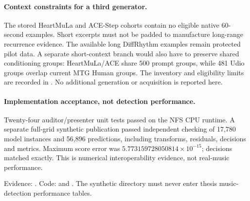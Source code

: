 \documentclass[11pt,a4paper]{article}
\begin{document}
\paragraph{Context constraints for a third generator.}
The stored HeartMuLa and ACE-Step cohorts contain no eligible native 60-second
examples. Short excerpts must not be padded to manufacture long-range
recurrence evidence. The available long DiffRhythm examples remain protected
pilot data. A separate short-context branch would also have to preserve shared
conditioning groups: HeartMuLa/ACE share 500 prompt groups, while 481 Udio
groups overlap current MTG Human groups. The inventory and eligibility limits
are recorded in . No additional
generation or acquisition is reported here.

\paragraph{Implementation acceptance, not detection performance.}
Twenty-four auditor/presenter unit tests passed on the NFS CPU runtime.
A separate full-grid synthetic publication passed independent checking of
17,780 model instances and 56,896 predictions, including transforms, residuals,
decisions and metrics. Maximum score error was
$5.773159728050814\times10^{-15}$; decisions matched exactly.
This is numerical interoperability evidence, not real-music performance.

Evidence: .
Code:  and
.
The synthetic directory 
must never enter thesis music-detection performance tables.
\end{document}
